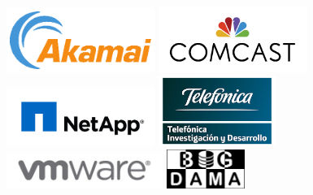\documentclass[sigconf]{acmart}
\begin{document}
\begin{center}
\includegraphics[width=1.9in]{akamai.png}
\hspace{0.2in}
\includegraphics[width=1.9in]{comcast.jpg}
\hspace{0.2in}
\includegraphics[width=1.9in]{netapp.jpeg}
\hspace{0.2in}
\includegraphics[width=1.5in]{telefonica.png}
\hspace{0.2in}
\includegraphics[width=2in]{vmware.jpg}
\hspace{0.2in}
\includegraphics[width=1in]{bigdama.jpg}
\hspace{0.2in}

\end{center}
\end{document}
